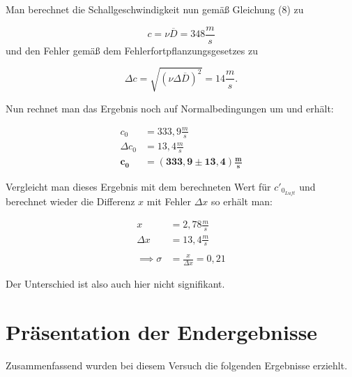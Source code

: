 \documentclass{article}
\begin{document}

Man berechnet die Schallgeschwindigkeit nun gemäß Gleichung (8) zu

\begin{equation}
    c = \nu \overline{D} = 348 \frac{m}{s}
\end{equation}
 und den Fehler gemäß dem Fehlerfortpflanzungsgesetzes zu

\begin{equation}
    \Delta c = \sqrt{(\nu \Delta \overline{D})^2} = 14 \frac{m}{s} .
\end{equation}

Nun rechnet man das Ergebnis noch auf Normalbedingungen um und erhält:

\begin{equation}
    \begin{split}
        c_0 &= 333,9 \frac{m}{s} \\
        \Delta c_0 &= 13,4 \frac{m}{s} \\
        \bm{c_0} &= \bm{(333,9 \pm 13,4) \frac{m}{s}}
    \end{split}
\end{equation}

Vergleicht man dieses Ergebnis mit dem berechneten Wert für $c'_{0_{Luft}}$ und berechnet wieder die Differenz $x$ mit Fehler $\Delta x$ so erhält man:

\begin{equation}
    \begin{split}
        x &= 2,78 \frac{m}{s} \\
        \Delta x &= 13,4 \frac{m}{s} \\ \\
        \implies \sigma &= \frac{x}{\Delta x} = 0,21
    \end{split}
\end{equation}

Der Unterschied ist also auch hier nicht signifikant.

\newpage

\section{Präsentation der Endergebnisse}

Zusammenfassend wurden bei diesem Versuch die folgenden Ergebnisse erziehlt.
\end{document}
